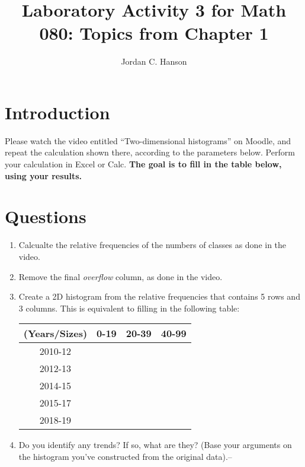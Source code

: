 \documentclass{article}
\begin{document}
\title{Laboratory Activity 3 for Math 080: Topics from Chapter 1}
\author{Jordan C. Hanson}
\maketitle

\section{Introduction}

Please watch the video entitled ``Two-dimensional histograms'' on Moodle, and repeat the calculation shown there, according to the parameters below.  Perform your calculation in Excel or Calc.  \textbf{The goal is to fill in the table below, using your results.}

\section{Questions}

\begin{enumerate}
\item Calcualte the relative frequencies of the numbers of classes as done in the video.
\item Remove the final \textit{overflow} column, as done in the video.
\item Create a 2D histogram from the relative frequencies that contains 5 rows and 3 columns.  This is equivalent to filling in the following table:
\begin{table}[ht]
\centering
\begin{tabular}{| c | c | c | c |}
\hline
\hline
(Years/Sizes) & 0-19 & 20-39 & 40-99 \\ \hline
2010-12 &  &  &  \\ \hline
2012-13 &  &  &  \\ \hline
2014-15 &  &  &  \\ \hline
2015-17 &  &  &  \\ \hline
2018-19 &  &  &  \\ \hline
\hline
\end{tabular}
\end{table}
\item Do you identify any trends?  If so, what are they?  (Base your arguments on the histogram you've constructed from the original data).--
\end{enumerate}
\end{document}
